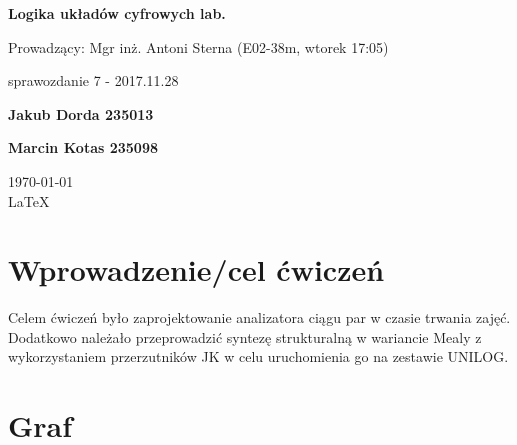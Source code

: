 \documentclass[12pt,a4paper]{article}
\begin{document}
	
	\begin{titlepage}
		
		\centering
		{\huge\bfseries Logika układów cyfrowych lab.\par}
		
		\vspace{0.5cm}
		Prowadzący: Mgr inż. Antoni Sterna (E02-38m, wtorek 17:05) \\
	
		\vspace{1.1cm}
		{\Large sprawozdanie 7 - 2017.11.28\par}
		\vfill
		
		{\large\bfseries Jakub Dorda 235013\par}
		{\large\bfseries Marcin Kotas 235098\par}
		
		\vspace{1cm}
		\today \\ \LaTeX
		
		\restoregeometry
	\end{titlepage}


	\section{Wprowadzenie/cel ćwiczeń}
	
		Celem ćwiczeń było zaprojektowanie analizatora ciągu par w czasie trwania zajęć. Dodatkowo należało przeprowadzić syntezę strukturalną  w wariancie Mealy z wykorzystaniem przerzutników JK w celu uruchomienia go na zestawie UNILOG.
		
	\section{Graf}
	
\end{document}
